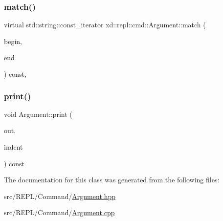 \subsubsection{\texorpdfstring{match()}{match()}}
{\footnotesize\ttfamily virtual std\+::string\+::const\+\_\+iterator xd\+::repl\+::cmd\+::\+Argument\+::match (\begin{DoxyParamCaption}\item[{std\+::string\+::const\+\_\+iterator}]{begin,  }\item[{std\+::string\+::const\+\_\+iterator}]{end }\end{DoxyParamCaption}) const\hspace{0.3cm}{\ttfamily [inline]}, {\ttfamily [virtual]}}

\mbox{\label{classxd_1_1repl_1_1cmd_1_1_argument_afe4be75f7aebddd6d5d1c59fea3867ca}} 
\subsubsection{\texorpdfstring{print()}{print()}}
{\footnotesize\ttfamily void Argument\+::print (\begin{DoxyParamCaption}\item[{std\+::ostream \&}]{out,  }\item[{\mbox{\hyperlink{classxd_1_1util_1_1_indent_helper}{xd\+::util\+::\+Indent\+Helper}} \&}]{indent }\end{DoxyParamCaption}) const}



The documentation for this class was generated from the following files\+:\begin{DoxyCompactItemize}
\item 
src/\+R\+E\+P\+L/\+Command/\mbox{\hyperlink{_argument_8hpp}{Argument.\+hpp}}\item 
src/\+R\+E\+P\+L/\+Command/\mbox{\hyperlink{_argument_8cpp}{Argument.\+cpp}}\end{DoxyCompactItemize}
